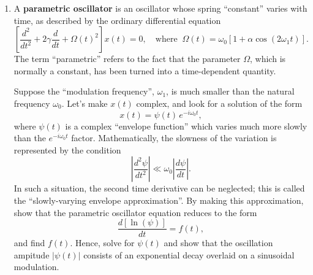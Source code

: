 \documentclass[10pt,a4paper]{article}
\begin{document}
\begin{enumerate}
\item
  A \textbf{parametric oscillator} is an oscillator whose spring
``constant'' varies with time, as described by the ordinary differential
equation
\begin{equation}
  \left[\frac{d^2}{dt^2} + 2\gamma\frac{d}{dt} + \Omega(t)^2\right]x(t) = 0, \quad\mathrm{where}\;\;\Omega(t) = \omega_0\left[1 + \alpha \cos(2\omega_1 t)\right].
\end{equation}
The term ``parametric'' refers to the fact that the parameter
$\Omega$, which is normally a constant, has been turned into a
time-dependent quantity.

Suppose the ``modulation frequency'', $\omega_1$, is much smaller than
the natural frequency $\omega_0$. Let's make $x(t)$ complex, and
look for a solution of the form
\begin{equation}
  x(t) = \psi(t) \, e^{-i\omega_0 t},
\end{equation}
where $\psi(t)$ is a complex ``envelope function'' which varies much
more slowly than the $e^{-i\omega_0 t}$ factor. Mathematically, the
slowness of the variation is represented by the condition
\begin{equation}
  \left|\frac{d^2\psi}{dt^2}\right| \ll \omega_0 \left|\frac{d\psi}{dt}\right|.
\end{equation}
In such a situation, the second time derivative can be neglected; this
is called the ``slowly-varying envelope approximation''. By making this
approximation, show that the parametric oscillator equation reduces to
the form
\begin{equation}
  \frac{d\left[\ln(\psi)\right]}{dt} = f(t),
\end{equation}
and find $f(t)$. Hence, solve for $\psi(t)$ and show that the
oscillation ampitude $|\psi(t)|$ consists of an exponential decay
overlaid on a sinusoidal modulation.

\end{enumerate}
\end{document}
